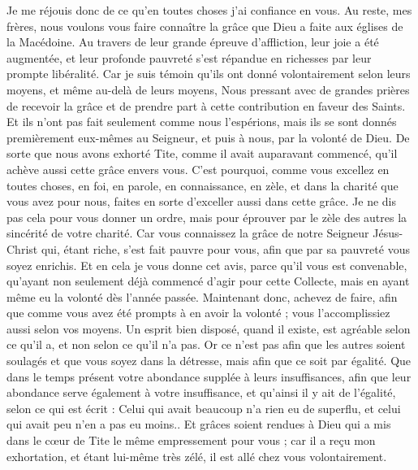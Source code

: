 \begin{multicols}{2}
Je me réjouis donc de ce qu'en toutes choses j'ai confiance en vous.
\VerseOne{}Au reste, mes frères, nous voulons vous faire connaître la grâce que Dieu a faite aux églises de la Macédoine.
Au travers de leur grande épreuve d'affliction, leur joie a été augmentée, et leur profonde pauvreté s'est répandue en richesses par leur prompte libéralité.
Car je suis témoin qu'ils ont donné volontairement selon leurs moyens, et même au-delà de leurs moyens,
Nous pressant avec de grandes prières de recevoir la grâce et de prendre part à cette contribution en faveur des Saints.
Et ils n'ont pas fait seulement comme nous l'espérions, mais ils se sont donnés premièrement eux-mêmes au Seigneur, et puis à nous, par la volonté de Dieu.
De sorte que nous avons exhorté Tite, comme il avait auparavant commencé, qu'il achève aussi cette grâce envers vous.
C'est pourquoi, comme vous excellez en toutes choses, en foi, en parole, en connaissance, en zèle, et dans la charité que vous avez pour nous, faites en sorte d’exceller aussi dans cette grâce.
Je ne dis pas cela pour vous donner un ordre, mais pour éprouver par le zèle des autres la sincérité de votre charité.
Car vous connaissez la grâce de notre Seigneur Jésus-Christ qui, étant riche, s'est fait pauvre pour vous, afin que par sa pauvreté vous soyez enrichis.
Et en cela je vous donne cet avis, parce qu'il vous est convenable, qu'ayant non seulement déjà commencé d'agir pour cette Collecte, mais en ayant même eu la volonté dès l'année passée.
Maintenant donc, achevez de faire, afin que comme vous avez été prompts à en avoir la volonté ; vous l'accomplissiez aussi selon vos moyens.
Un esprit bien disposé, quand il existe, est agréable selon ce qu'il a, et non selon ce qu'il n'a pas.
Or ce n'est pas afin que les autres soient soulagés et que vous soyez dans la détresse, mais afin que ce soit par égalité. Que dans le temps présent votre abondance supplée à leurs insuffisances, 
afin que leur abondance serve également à votre insuffisance, et qu'ainsi il y ait de l'égalité,
selon ce qui est écrit : Celui qui avait beaucoup n'a rien eu de superflu, et celui qui avait peu n'en a pas eu moins..
Et grâces soient rendues à Dieu qui a mis dans le cœur de Tite le même empressement pour vous ;
car il a reçu mon exhortation, et étant lui-même très zélé, il est allé chez vous volontairement.

\end{multicols}

